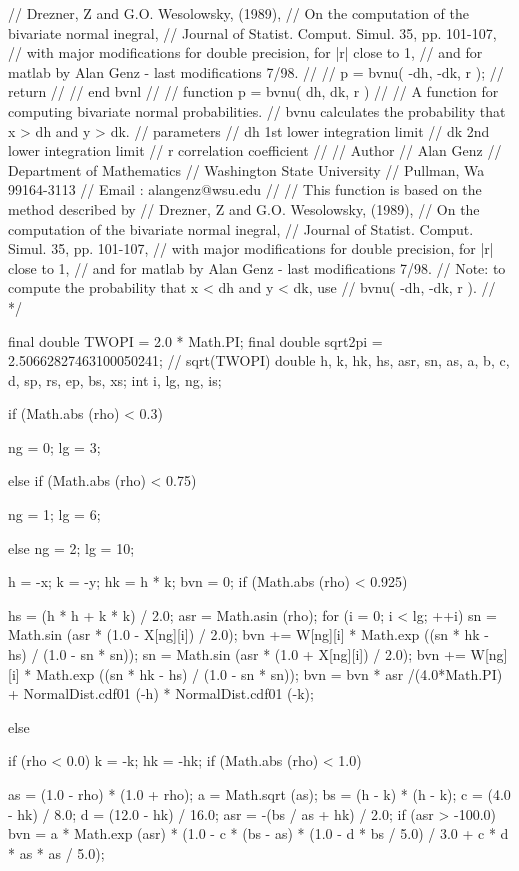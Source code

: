 \begin{code}
\begin{hide}
{//        Drezner, Z and G.O. Wesolowsky, (1989),
//        On the computation of the bivariate normal inegral,
//        Journal of Statist. Comput. Simul. 35, pp. 101-107,
//    with major modifications for double precision, for |r| close to 1,
//    and for matlab by Alan Genz - last modifications 7/98.
//
//      p = bvnu( -dh, -dk, r );
//      return
//
//   end bvnl
//
//      function p = bvnu( dh, dk, r )
//
//  A function for computing bivariate normal probabilities.
//  bvnu calculates the probability that x > dh and y > dk. 
//    parameters  
//      dh 1st lower integration limit
//      dk 2nd lower integration limit
//      r   correlation coefficient
//
//   Author
//       Alan Genz
//       Department of Mathematics
//       Washington State University
//       Pullman, Wa 99164-3113
//       Email : alangenz@wsu.edu
//
//    This function is based on the method described by 
//        Drezner, Z and G.O. Wesolowsky, (1989),
//        On the computation of the bivariate normal inegral,
//        Journal of Statist. Comput. Simul. 35, pp. 101-107,
//    with major modifications for double precision, for |r| close to 1,
//    and for matlab by Alan Genz - last modifications 7/98.
//        Note: to compute the probability that x < dh and y < dk, use 
//              bvnu( -dh, -dk, r ). 
//
*/

      final double TWOPI = 2.0 * Math.PI;
      final double sqrt2pi = 2.50662827463100050241; // sqrt(TWOPI)
      double h, k, hk, hs, asr, sn, as, a, b, c, d, sp, rs, ep, bs, xs;
      int i, lg, ng, is;

      if (Math.abs (rho) < 0.3) {
         ng = 0;
         lg = 3;

      } else if (Math.abs (rho) < 0.75) {
         ng = 1;
         lg = 6;

      } else {
         ng = 2;
         lg = 10;
      }

      h = -x;
      k = -y;
      hk = h * k;
      bvn = 0;
      if (Math.abs (rho) < 0.925) {
         hs = (h * h + k * k) / 2.0;
         asr = Math.asin (rho);
         for (i = 0; i < lg; ++i) {
            sn = Math.sin (asr * (1.0 - X[ng][i]) / 2.0);
            bvn += W[ng][i] * Math.exp ((sn * hk - hs) / (1.0 - sn * sn));
            sn = Math.sin (asr * (1.0 + X[ng][i]) / 2.0);
            bvn += W[ng][i] * Math.exp ((sn * hk - hs) / (1.0 - sn * sn));
         }
         bvn =  bvn * asr /(4.0*Math.PI) + 
                NormalDist.cdf01 (-h) * NormalDist.cdf01 (-k);

      } else {
         if (rho < 0.0) {
            k = -k;
            hk = -hk;
         }
         if (Math.abs (rho) < 1.0) {
            as = (1.0 - rho) * (1.0 + rho);
            a = Math.sqrt (as);
            bs = (h - k) * (h - k);
            c = (4.0 - hk) / 8.0;
            d = (12.0 - hk) / 16.0;
            asr = -(bs / as + hk) / 2.0;
            if (asr > -100.0)
               bvn = a * Math.exp (asr) * (1.0 - c * (bs - as) * (1.0 -
                     d * bs / 5.0) / 3.0 + c * d * as * as / 5.0);

}}}
\end{hide}
\end{code}
